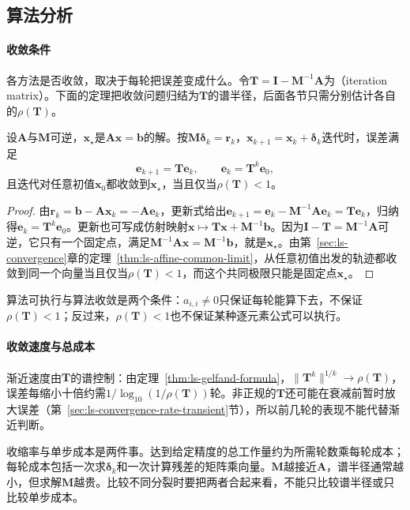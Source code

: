 \subsection{算法分析}

\paragraph{收敛条件}
各方法是否收敛，取决于每轮把误差变成什么。令$\bm T=\bm I-\bm M^{-1}\bm A$为（iteration matrix）。下面的定理把收敛问题归结为$\bm T$的谱半径，后面各节只需分别估计各自的$\rho(\bm T)$。
\begin{theorem}[定常迭代的收敛判据]
\label{thm:ls-stationary-convergence}
设$\bm A$与$\bm M$可逆，$\bm x_\star$是$\bm A\bm x=\bm b$的解。按$\bm M\bm\delta_k=\bm r_k$，$\bm x_{k+1}=\bm x_k+\bm\delta_k$迭代时，误差满足
\[
\bm e_{k+1}=\bm T\bm e_k,\qquad \bm e_k=\bm T^k\bm e_0 ,
\]
且迭代对任意初值$\bm x_0$都收敛到$\bm x_\star$，当且仅当$\rho(\bm T)<1$。
\end{theorem}
\begin{proof}
由$\bm r_k=\bm b-\bm A\bm x_k=-\bm A\bm e_k$，更新式给出$\bm e_{k+1}=\bm e_k-\bm M^{-1}\bm A\bm e_k=\bm T\bm e_k$，归纳得$\bm e_k=\bm T^k\bm e_0$。更新也可写成仿射映射$\bm x\mapsto\bm T\bm x+\bm M^{-1}\bm b$。因为$\bm I-\bm T=\bm M^{-1}\bm A$可逆，它只有一个固定点，满足$\bm M^{-1}\bm A\bm x=\bm M^{-1}\bm b$，就是$\bm x_\star$。由第~\ref{sec:ls-convergence}章的定理~\ref{thm:ls-affine-common-limit}，从任意初值出发的轨迹都收敛到同一个向量当且仅当$\rho(\bm T)<1$，而这个共同极限只能是固定点$\bm x_\star$。
\end{proof}
算法可执行与算法收敛是两个条件：$a_{i,i}\neq0$只保证每轮能算下去，不保证$\rho(\bm T)<1$；反过来，$\rho(\bm T)<1$也不保证某种逐元素公式可以执行。

\paragraph{收敛速度与总成本}
渐近速度由$\bm T$的谱控制：由定理~\ref{thm:ls-gelfand-formula}，$\lVert\bm T^k\rVert^{1/k}\to\rho(\bm T)$，误差每缩小十倍约需$1/\log_{10}(1/\rho(\bm T))$轮。非正规的$\bm T$还可能在衰减前暂时放大误差（第~\ref{sec:ls-convergence-rate-transient}节），所以前几轮的表现不能代替渐近判断。

收缩率与单步成本是两件事。达到给定精度的总工作量约为所需轮数乘每轮成本；每轮成本包括一次求$\bm\delta_k$和一次计算残差的矩阵乘向量。$\bm M$越接近$\bm A$，谱半径通常越小，但求解$\bm M$越贵。比较不同分裂时要把两者合起来看，不能只比较谱半径或只比较单步成本。

